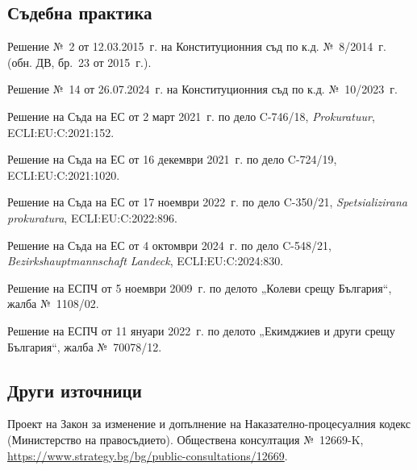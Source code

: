 {\subsection*{Съдебна практика}
\begin{biblist}[resume*=bib]
\item Решение №~2 от 12.03.2015~г. на Конституционния съд по к.д. №~8/2014~г. (обн. ДВ,
  бр.~23 от 2015~г.).
\item Решение №~14 от 26.07.2024~г. на Конституционния съд по к.д. №~10/2023~г.
\item Решение на Съда на ЕС от 2 март 2021~г. по дело C-746/18, \textit{Prokuratuur},
  ECLI:EU:C:2021:152.
\item Решение на Съда на ЕС от 16 декември 2021~г. по дело C-724/19,
  ECLI:EU:C:2021:1020.
\item Решение на Съда на ЕС от 17 ноември 2022~г. по дело C-350/21, \textit{Spetsializirana
  prokuratura}, ECLI:EU:C:2022:896.
\item Решение на Съда на ЕС от 4 октомври 2024~г. по дело C-548/21,
  \textit{Bezirkshauptmannschaft Landeck}, ECLI:EU:C:2024:830.
\item Решение на ЕСПЧ от 5 ноември 2009~г. по делото „Колеви срещу България“, жалба №~1108/02.
\item Решение на ЕСПЧ от 11 януари 2022~г. по делото „Екимджиев и други срещу България“, жалба №~70078/12.
\end{biblist}

\subsection*{Други източници}
\begin{biblist}[resume*=bib]
\item Проект на Закон за изменение и допълнение на Наказателно-процесуалния кодекс
  (Министерство на правосъдието). Обществена консултация №~12669-K,
  \url{https://www.strategy.bg/bg/public-consultations/12669}.
\end{biblist}

}
